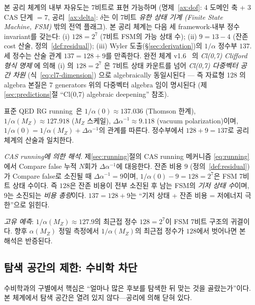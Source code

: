 \documentclass[entropy,article,submit,pdftex,oneauthor]{Definitions/mdpi}
\begin{document}
본 공리 체계의 내부 자유도는 7비트로 표현 가능하며 (명제~\ref{ax:dof}: 4 도메인 축 + 3 CAS 단계 $= 7$, 공리~\ref{ax:delta}: $\delta$는 이 7비트 \emph{유한 상태 기계 (Finite State Machine, FSM)} 밖의 전역 플래그). 본 공리 체계는 다음 세 framework-내부 정수 invariant를 갖는다: (i) $128 = 2^7$ (7비트 FSM의 가능 상태 수); (ii) $9 = 13 - 4$ (잔존 cost 산술, 정의~\ref{def:residual}); (iii) Wyler 도출(\S\ref{sec:derivation})의 $1/\alpha$ 정수부 $137$. 세 정수는 산술 관계 $137 = 128 + 9$를 만족한다. 완전 체계 v1.6~\cite{han2026} 의 \emph{Cl(0,7) Clifford 형식 명제} 에 의해 (i) 의 $128 = 2^7$ 은 7비트 상태 카운트를 넘어 \emph{Cl(0,7) 다중벡터 공간 차원} (식~\eqref{eq:cl7-dimension}) 으로 algebraically 동일시된다 — 즉 자료형 128 의 algebra 본질은 7 generators 위의 다중벡터 algebra 임이 명시된다 (제\ref{sec:predictions}절 ``Cl(0,7) algebraic deepening'' 참조).

표준 QED RG running~\cite{pdg2024}은 $1/\alpha(0) \approx 137.036$ (Thomson 한계), $1/\alpha(M_Z) \approx 127.918$ ($M_Z$ 스케일), $\Delta\alpha^{-1} \approx 9.118$ (vacuum polarization)이며, $1/\alpha(0) = 1/\alpha(M_Z) + \Delta\alpha^{-1}$의 관계를 따른다. 정수부에서 $128 + 9 = 137$로 공리 체계의 산술과 일치한다.

\emph{CAS running에 의한 해석}. 제\ref{sec:running}절의 CAS running 메커니즘 \eqref{eq:running}에서 Compare false 누적 $N$회가 $\Delta\alpha^{-1}$에 대응한다. 잔존 비용 $9$ (정의~\ref{def:residual})가 Compare false로 소진될 때 $\Delta\alpha^{-1} = 9$이며, $1/\alpha(0) - 9 = 128 = 2^7$은 FSM 7비트 상태 수이다. 즉 $128$은 잔존 비용이 전부 소진된 후 남는 FSM의 \emph{기저 상태 수}이며, $9$는 소진되는 \emph{비용 총량}이다. $137 = 128 + 9$는 ``기저 상태 + 잔존 비용 = 저에너지 극한''으로 읽힌다.

\emph{고유 예측}: $1/\alpha(M_Z) \approx 127.9$의 최근접 정수 $128 = 2^7$이 FSM 7비트 구조의 귀결이다. 향후 $\alpha(M_Z)$ 정밀 측정에서 $1/\alpha(M_Z)$의 최근접 정수가 $128$에서 벗어나면 본 해석은 반증된다.

\subsection{탐색 공간의 제한: 수비학 차단}

수비학과의 구별에서 핵심은 ``얼마나 많은 후보를 탐색한 뒤 맞는 것을 골랐는가''이다. 본 체계에서 탐색 공간은 열려 있지 않다---공리에 의해 닫혀 있다.
\end{document}
